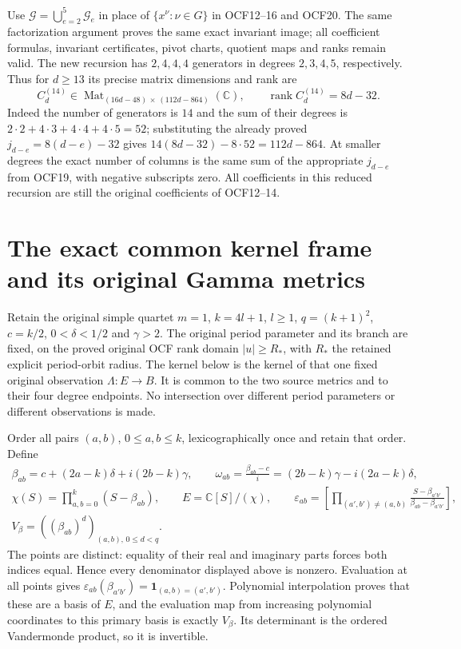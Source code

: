 \documentclass[11pt,a4paper]{article}
\begin{document}
Use $\mathcal G=\bigcup_{e=2}^5\mathcal G_e$ in place of
$\{x^\nu:\nu\in G\}$ in OCF12--16 and OCF20. The same
factorization argument proves the same exact invariant image;
all coefficient formulas, invariant certificates, pivot charts,
quotient maps and ranks remain valid. The new recursion has
$2,4,4,4$ generators in degrees $2,3,4,5$, respectively. Thus
for $d\geq13$ its precise matrix dimensions and rank are
\[
 C_d^{(14)}\in
 \operatorname{Mat}_{(16d-48)\,\times\,(112d-864)}(\mathbb C),
 \qquad \operatorname{rank}C_d^{(14)}=8d-32.
 \tag{OCF26}
\]
Indeed the number of generators is $14$ and the sum of their
degrees is $2\cdot2+4\cdot3+4\cdot4+4\cdot5=52$; substituting
the already proved $j_{d-e}=8(d-e)-32$ gives
$14(8d-32)-8\cdot52=112d-864$. At smaller degrees the exact
number of columns is the same sum of the appropriate $j_{d-e}$
from OCF19, with negative subscripts zero. All coefficients
in this reduced recursion are still the original coefficients
of OCF12--14.


\clearpage
\section{The exact common kernel frame and its original Gamma metrics}
\label{sec:OKM}

Retain the original simple quartet $m=1$, $k=4l+1$, $l\geq1$,
$q=(k+1)^2$, $c=k/2$, $0<\delta<1/2$ and $\gamma>2$.
The original period parameter and its branch are fixed, on the proved
original OCF rank domain $|u|\geq R_*$, with $R_*$ the retained
explicit period-orbit radius. The kernel
below is the kernel of that one fixed original observation
$\Lambda:E\to B$. It is common to the two source metrics and to
their four degree endpoints. No intersection over different period
parameters or different observations is made.

Order all pairs $(a,b)$, $0\leq a,b\leq k$, lexicographically once
and retain that order. Define
\[
 \begin{gathered}
 \beta_{ab}=c+(2a-k)\delta+i(2b-k)\gamma,\qquad
 \omega_{ab}=\frac{\beta_{ab}-c}{i}
                =(2b-k)\gamma-i(2a-k)\delta,\\
 \chi(S)=\prod_{a,b=0}^k(S-\beta_{ab}),\qquad
 E=\mathbb C[S]/(\chi),\qquad
 \varepsilon_{ab}=
 \left[\prod_{(a',b')\ne(a,b)}
       \frac{S-\beta_{a'b'}}{\beta_{ab}-\beta_{a'b'}}\right],\\
 V_\beta=((\beta_{ab})^d)_{(a,b),\,0\leq d<q}.
 \end{gathered}\tag{OKM1}
\]
The points are distinct: equality of their real and imaginary parts
forces both indices equal. Hence every denominator displayed above
is nonzero. Evaluation at all points gives
$\varepsilon_{ab}(\beta_{a'b'})=\mathbf1_{(a,b)=(a',b')}$.
Polynomial interpolation proves that these are a basis of $E$, and
the evaluation map from increasing polynomial coordinates to this
primary basis is exactly $V_\beta$. Its determinant is the ordered
Vandermonde product, so it is invertible.
\end{document}
